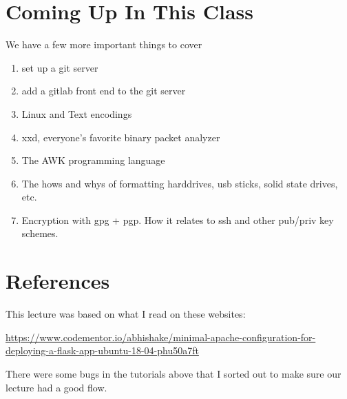 \documentclass[10pt]{article}
\begin{document}
\section{Coming Up In This Class}

We have a few more important things to cover
\begin{enumerate}
\item set up a git server
\item add a gitlab front end to the git server
\item Linux and Text encodings
\item xxd, everyone's favorite binary packet analyzer
\item The AWK programming language
\item The hows and whys of formatting harddrives, usb sticks, solid state drives, etc.
\item Encryption with gpg + pgp. How it relates to ssh and other pub/priv key schemes.
\end{enumerate}

\section{References}
This lecture was based on what I read  on these websites:

\url{https://www.codementor.io/abhishake/minimal-apache-configuration-for-deploying-a-flask-app-ubuntu-18-04-phu50a7ft}



There were some bugs in the tutorials above that I sorted out to make sure our lecture had a good flow.
\end{document}
